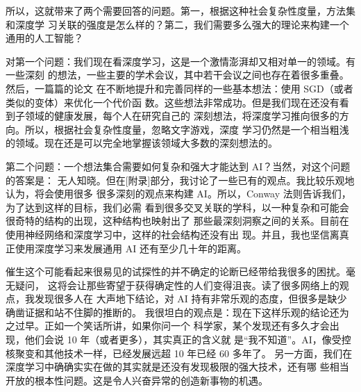 所以，这就带来了两个需要回答的问题。第一，根据这种社会复杂性度量，方法集和深度学
习关联的强度是怎么样的？第二，我们需要多么强大的理论来构建一个通用的人工智能？

对第一个问题：我们现在看深度学习，这是一个激情澎湃却又相对单一的领域。有一些深刻
的想法，一些主要的学术会议，其中若干会议之间也存在着很多重叠。然后，一篇篇的论文
在不断地提升和完善同样的一些基本想法：使用 SGD（或者类似的变体）来优化一个代价函
数。这些想法非常成功。但是我们现在还没有看到子领域的健康发展，每个人在研究自己的
深刻想法，将深度学习推向很多的方向。所以，根据社会复杂性度量，忽略文字游戏，深度
学习仍然是一个相当粗浅的领域。现在还是可以完全地掌握该领域大多数的深刻想法的。

第二个问题：一个想法集合需要如何复杂和强大才能达到 AI？当然，对这个问题的答案是：
无人知晓。但在[附录]部分，我讨论了一些已有的观点。我比较乐观地认为，将会使用很多
很多深刻的观点来构建 AI。所以，Conway 法则告诉我们，为了达到这样的目标，我们必需
看到很多交叉关联的学科，以一种复杂和可能会很奇特的结构的出现，这种结构也映射出了
那些最深刻洞察之间的关系。目前在使用神经网络和深度学习中，这样的社会结构还没有出
现。并且，我也坚信离真正使用深度学习来发展通用 AI 还有至少几十年的距离。

催生这个可能看起来很易见的试探性的并不确定的论断已经带给我很多的困扰。毫无疑问，
这将会让那些寄望于获得确定性的人们变得沮丧。读了很多网络上的观点，我发现很多人在
大声地下结论，对 AI 持有非常乐观的态度，但很多是缺少确凿证据和站不住脚的推断的。
我很坦白的观点是：现在下这样乐观的结论还为之过早。正如一个笑话所讲，如果你问一个
科学家，某个发现还有多久才会出现，他们会说 10 年（或者更多），其实真正的含义就
是“我不知道”。AI，像受控核聚变和其他技术一样，已经发展远超 10 年已经 60 多年了。
另一方面，我们在深度学习中确确实实在做的其实就是还没有发现极限的强大技术，还有哪
些相当开放的根本性问题。这是令人兴奋异常的创造新事物的机遇。
